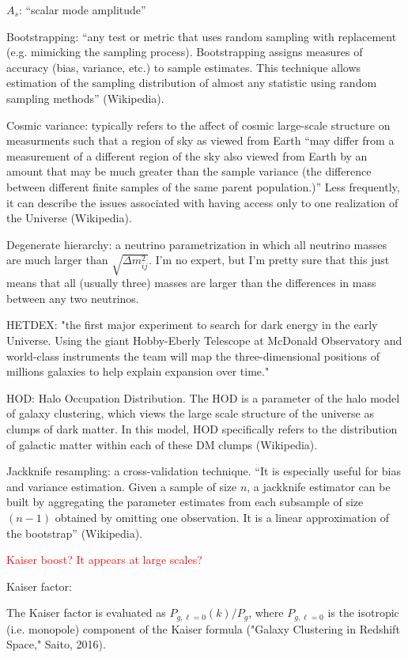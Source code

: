 \documentclass[11pt]{article}
\begin{document}
$A_s$: ``scalar mode amplitude''

Bootstrapping: ``any test or metric that uses random sampling with replacement
(e.g. mimicking the sampling process). Bootstrapping assigns measures of
accuracy (bias, variance, etc.) to sample estimates. This technique allows
estimation of the sampling distribution of almost any statistic using random
sampling methods'' (Wikipedia).

Cosmic variance: typically refers to the affect of cosmic large-scale structure
on measurments such that a region of sky as viewed from Earth ``may differ from
a measurement of a different region of the sky also viewed from Earth by an
amount that may be much greater than the sample variance (the difference
between different finite samples of the same parent population.)'' Less
frequently, it can describe the issues associated with having access only to
one realization of the Universe (Wikipedia). 

Degenerate hierarchy: a neutrino parametrization in which all
neutrino masses are much larger than $\sqrt{\Delta m_{ij}^2}$. I'm no expert,
but I'm pretty sure that this just means that all (usually three) masses are
larger than
the differences in mass between any two neutrinos.

HETDEX: "the first major experiment to search for dark energy in the
early Universe. Using the giant Hobby-Eberly Telescope at McDonald Observatory
and world-class instruments the team will map the three-dimensional positions
of millions galaxies to help explain expansion over time."

HOD: Halo Occupation Distribution. The HOD is a parameter of the halo model of
galaxy clustering, which views the large scale structure of the universe as
clumps of dark matter. In this model, HOD specifically refers to the
distribution of galactic matter within each of these DM clumps (Wikipedia).

Jackknife resampling: a cross-validation technique. ``It is especially useful
for bias and variance estimation. Given a sample of size $n$, a jackknife
estimator can be built by aggregating the parameter estimates from each
subsample of size $(n - 1)$ obtained by omitting one observation. It is a
linear approximation of the bootstrap'' (Wikipedia).

\textcolor{red}{Kaiser boost? It appears at large scales?}

Kaiser factor:

The Kaiser factor is evaluated as $P_{g, \ell=0} (k) / P_g$, where
$P_{g, \ell=0}$ is the isotropic (i.e. monopole) component of the Kaiser
formula ("Galaxy Clustering in Redshift Space," Saito, 2016).
\end{document}
